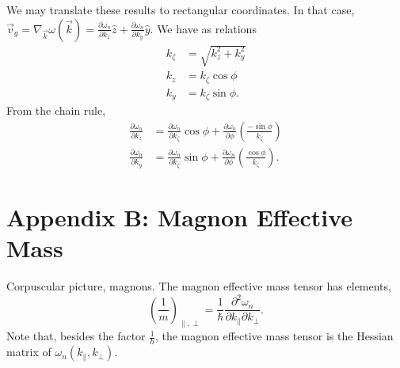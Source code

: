 \documentclass{article}
\begin{document}
We may translate these results to rectangular coordinates. In that case, $\vec{v}_{g} = \nabla_{\vec{k}} \omega (\vec{k}) = \frac{\partial \omega_{n}}{\partial k_{z}} \hat{z} + \frac{\partial \omega_{n}}{\partial k_{y}} \hat{y}$. We have as relations
\begin{align}
k_{\zeta} &= \sqrt{k_{z}^2 + k_{y}^2} \\
k_{z} &= k_{\zeta} \cos{\phi} \\
k_{y} &= k_{\zeta} \sin{\phi}.
\end{align}
From the chain rule,
\begin{align}
\frac{\partial \omega_{n}}{\partial k_{z}} &= \frac{\partial \omega_{n}}{\partial k_{\zeta}} \cos{\phi} + \frac{\partial \omega_{n}}{\partial \phi} \left(\frac{-\sin{\phi}}{k_{\zeta}}\right) \\
\frac{\partial \omega_{n}}{\partial k_{y}} &= \frac{\partial \omega_{n}}{\partial k_{\zeta}} \sin{\phi} + \frac{\partial \omega_{n}}{\partial \phi} \left(\frac{\cos{\phi}}{k_{\zeta}}\right).
\end{align}

\section{Appendix B: Magnon Effective Mass}
Corpuscular picture, magnons. The magnon effective mass tensor has elements,
\begin{equation}
\left(\frac{1}{m}\right)_{\parallel , \perp} = \frac{1}{\hbar} \frac{\partial^2 \omega_{n}}{\partial k_{\parallel} \partial k_{\perp}}.
\end{equation}
Note that, besides the factor $\frac{1}{\hbar}$, the magnon effective mass tensor is the Hessian matrix of $\omega_{n} ( k_{\parallel} , k_{\perp} )$.
\end{document}
